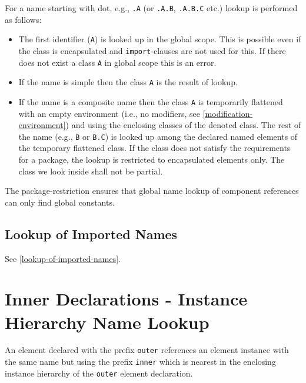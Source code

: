 For a name starting with dot, e.g., \lstinline!.A! (or \lstinline!.A.B!, \lstinline!.A.B.C! etc.) lookup is performed as follows:
\begin{itemize}
\item
  The first identifier (\lstinline!A!) is looked up in the global scope.
  This is possible even if the class is encapsulated and \lstinline!import!-clauses are not used for this.
  If there does not exist a class \lstinline!A! in global scope this is an error.
\item
  If the name is simple then the class \lstinline!A! is the result of lookup.
\item
  If the name is a composite name then the class \lstinline!A! is temporarily flattened with an empty environment (i.e., no modifiers, see \cref{modification-environment}) and using the enclosing classes of the denoted class.
  The rest of the name (e.g., \lstinline!B! or \lstinline!B.C!) is looked up among the declared named elements of the temporary flattened class.
  If the class does not satisfy the requirements for a package, the lookup is restricted to encapsulated elements only.
  The class we look inside shall not be partial.
\end{itemize}

\begin{nonnormative}
The package-restriction ensures that global name lookup of component references can only find global constants.
\end{nonnormative}


\subsection{Lookup of Imported Names}\label{lookup-of-imported-names1}

See \cref{lookup-of-imported-names}.


\section{Inner Declarations - Instance Hierarchy Name Lookup}\label{instance-hierarchy-name-lookup-of-inner-declarations}\label{inner-declarations-instance-hierarchy-name-lookup}

An element declared with the prefix \lstinline!outer! references an element instance with the same name but using the prefix \lstinline!inner! which is nearest in the enclosing instance hierarchy of the \lstinline!outer! element declaration.

